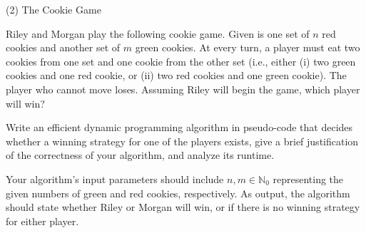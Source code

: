 \documentclass[11pt]{amsart}
\begin{document}
(2) The Cookie Game\medskip

Riley and Morgan play the following cookie game. Given is one set of $n$ red cookies and another set of $m$ green 
cookies. At every turn, a player must eat two cookies from one set and one cookie from the other set (i.e., 
either (i) two green cookies and one red cookie, or (ii) two red cookies and one green cookie). The player who 
cannot move loses. Assuming Riley will begin the game, which player will win?\medskip

Write an efficient dynamic programming algorithm in pseudo-code that decides whether a winning strategy for one of the players exists,
give a brief justification of the correctness of your algorithm, and analyze its runtime.\medskip

Your algorithm's input parameters should include $n, m \in \mathbb{N}_0$ representing the given numbers of green 
and red cookies, respectively. As output, the algorithm should state whether Riley or Morgan will win, or if there is no
winning strategy for either player.\\
\end{document}
